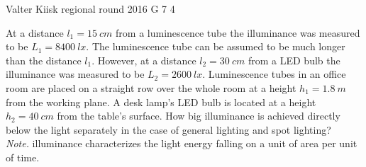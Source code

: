\documentclass[11pt]{article}
\begin{document}
{Valter Kiisk} %
{regional round} %
{2016} %
{G 7} %
{4} %
{

\ifEngStatement
At a distance $l_1=\SI{15}{cm}$ from a luminescence tube the illuminance was measured to be $L_1=\SI{8400}{lx}$. The luminescence tube can be assumed to be much longer than the distance $l_1$. However, at a distance $l_2=\SI{30}{cm}$ from a LED bulb the illuminance was measured to be $L_2=\SI{2600}{lx}$. Luminescence tubes in an office room are placed on a straight row over the whole room at a height $h_1=\SI{1.8}{m}$ from the working plane. A desk lamp’s LED bulb is located at a height $h_2=\SI{40}{cm}$ from the table’s surface. How big illuminance is achieved directly below the light separately in the case of general lighting and spot lighting?\\
\emph{Note.} illuminance characterizes the light energy falling on a unit of area per unit of time.
\fi
}
\end{document}

